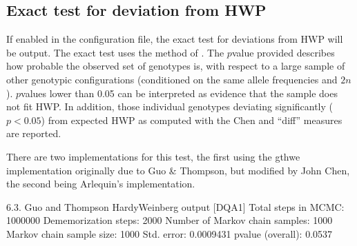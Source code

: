 \documentclass[letterpaper,10pt,english,openany,oneside]{sphinxmanual}
\begin{document}
\subsection{Exact test for deviation from HWP}
\label{\detokenize{docs/guide-chapter-instructions:exact-test-for-deviation-from-hwp}}\label{\detokenize{docs/guide-chapter-instructions:instructions-hardyweinberg-exact}}
\sphinxAtStartPar
If enabled in the configuration file, the exact test for deviations from
HWP will be output. The exact test uses the method of .
The \(p\)\sphinxhyphen{}value provided describes how probable the observed set of
genotypes is, with respect to a large sample of other genotypic
configurations (conditioned on the same allele frequencies and \(2n\)).
\(p\)\sphinxhyphen{}values lower than 0.05 can be interpreted as evidence that the
sample does not fit HWP. In addition, those individual genotypes
deviating significantly (\(p< 0.05\)) from expected HWP as
computed with the Chen and “diff” measures are reported.

\sphinxAtStartPar
There are two implementations for this test, the first using the gthwe
implementation originally due to Guo \& Thompson, but modified by John
Chen, the second being Arlequin’s  implementation.

\begin{sphinxVerbatim}[commandchars=\\\{\}]
6.3. Guo and Thompson HardyWeinberg output [DQA1]
\PYGZhy{}\PYGZhy{}\PYGZhy{}\PYGZhy{}\PYGZhy{}\PYGZhy{}\PYGZhy{}\PYGZhy{}\PYGZhy{}\PYGZhy{}\PYGZhy{}\PYGZhy{}\PYGZhy{}\PYGZhy{}\PYGZhy{}\PYGZhy{}\PYGZhy{}\PYGZhy{}\PYGZhy{}\PYGZhy{}\PYGZhy{}\PYGZhy{}\PYGZhy{}\PYGZhy{}\PYGZhy{}\PYGZhy{}\PYGZhy{}\PYGZhy{}\PYGZhy{}\PYGZhy{}\PYGZhy{}\PYGZhy{}\PYGZhy{}\PYGZhy{}\PYGZhy{}\PYGZhy{}\PYGZhy{}\PYGZhy{}\PYGZhy{}\PYGZhy{}\PYGZhy{}\PYGZhy{}\PYGZhy{}\PYGZhy{}\PYGZhy{}\PYGZhy{}\PYGZhy{}\PYGZhy{}\PYGZhy{}
Total steps in MCMC: 1000000
Dememorization steps: 2000
Number of Markov chain samples: 1000
Markov chain sample size: 1000
Std. error: 0.0009431
p\PYGZhy{}value (overall): 0.0537
\end{sphinxVerbatim}
\end{document}
